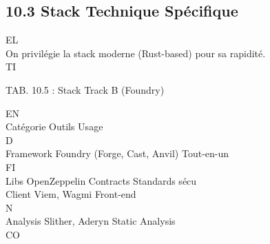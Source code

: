 \subsection{10.3 Stack Technique Spécifique}
\vspace{0.5em}
\vspace{0.5em}
\vspace{0.5em}
\vspace{0.5em}
EL\\
On privilégie la stack moderne (Rust-based) pour sa rapidité.\\
\vspace{0.5em}
\vspace{0.5em}
\vspace{0.5em}
\vspace{0.5em}
TI\\
\begin{center}\begin{tabular}TAB. 10.5 : Stack Track B (Foundry)\end{tabular}\end{center}
\vspace{0.5em}
\vspace{0.5em}
\vspace{0.5em}
\vspace{0.5em}
EN\\
Catégorie Outils                       Usage\\
\vspace{0.5em}
\vspace{0.5em}
\vspace{0.5em}
\vspace{0.5em}
D\\
Framework Foundry (Forge, Cast, Anvil) Tout-en-un\\
\vspace{0.5em}
\vspace{0.5em}
\vspace{0.5em}
\vspace{0.5em}
FI\\
Libs      OpenZeppelin Contracts       Standards sécu\\
Client    Viem, Wagmi                  Front-end\\
\vspace{0.5em}
N\\
Analysis  Slither, Aderyn              Static Analysis\\
CO\\
\vspace{0.5em}
